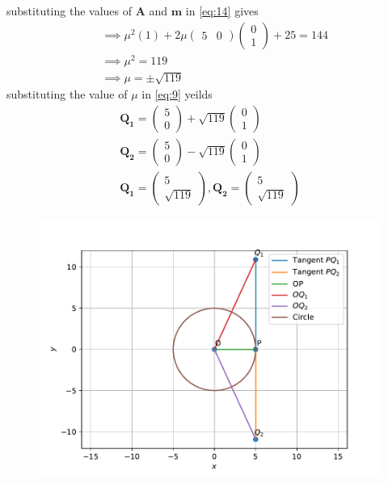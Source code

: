 \documentclass[12pt]{article}
\newcommand{\myvec}[1]{\ensuremath{\begin{pmatrix}#1\end{pmatrix}}}
\let\vec\mathbf
\begin{document}
\begin{enumerate}
		substituting the values of $\vec{A}$ and $\vec{m}$ in \eqref{eq:14} gives
\begin{align}
	&\implies\mu^2(1)+2\mu\myvec{5&0}\myvec{0\\1}+25=144\\
	&\implies\mu^2=119\\
	&\implies\mu=\pm\sqrt{119}
\end{align}
		substituting the value of $\mu$ in \eqref{eq:9} yeilds 
\begin{align}
	\vec{Q_1}=\myvec{5\\0}+\sqrt{119}\myvec{0\\1}\\
	\vec{Q_2}=\myvec{5\\0}-\sqrt{119}\myvec{0\\1}\\
	\vec{Q_1}=\myvec{5\\\sqrt{119}},\vec{Q_2}=\myvec{5\\\sqrt{119}}
\end{align}
\begin{figure}[!h]
\begin{center}
\includegraphics[width=\columnwidth]{figs/fig2.pdf}
\end{center}
\caption{}
\label{fig:Fig1}
\end{figure}
\end{enumerate}
\end{document}
